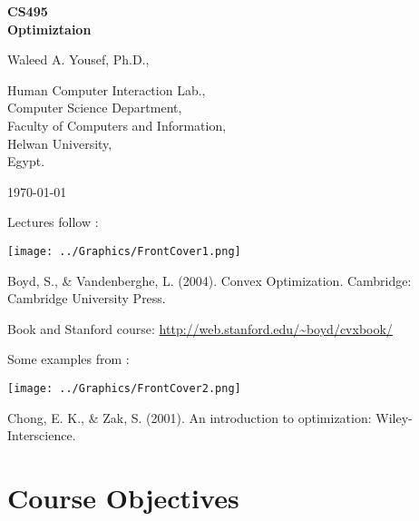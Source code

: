 \begin{titlingpage}
  \begin{center}
    \vspace*{1in}

    \textbf{\large CS495\\ Optimiztaion}

    \vspace*{1in}

    Waleed A. Yousef, Ph.D.,

    \bigskip

    Human Computer Interaction Lab.,\\Computer Science Department,\\Faculty of Computers and
    Information,\\Helwan University,\\Egypt.

    \bigskip

    \today

  \end{center}
\end{titlingpage}

\clearpage

\hfil\begin{minipage}[t]{0.3\linewidth}
  Lectures follow \cite{Boyd204ConvexOptimization}:

  \bigskip

  \hfil\texttt{[image: ../Graphics/FrontCover1.png]}\hfil

  Boyd, S., \& Vandenberghe, L. (2004). Convex Optimization. Cambridge: Cambridge University Press.

  \bigskip

  Book and Stanford course: \url{http://web.stanford.edu/~boyd/cvxbook/}

\end{minipage}\hfil
\begin{minipage}[t]{0.3\linewidth}
  Some examples from \cite{Chong2001AnIntorductionToOptimization}:

  \bigskip

  \hfil\texttt{[image: ../Graphics/FrontCover2.png]}\hfil

  Chong, E. K., \& Zak, S. (2001). An introduction to optimization: Wiley-Interscience.
\end{minipage}

\clearpage
\chapter*{Course Objectives}

